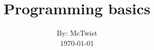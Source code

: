 

\def\writer{McTwist}

\title{Programming basics}
\author{By: \writer\\
	\today}



\maketitle

\newpage
\tableofcontents

\newpage
{}







